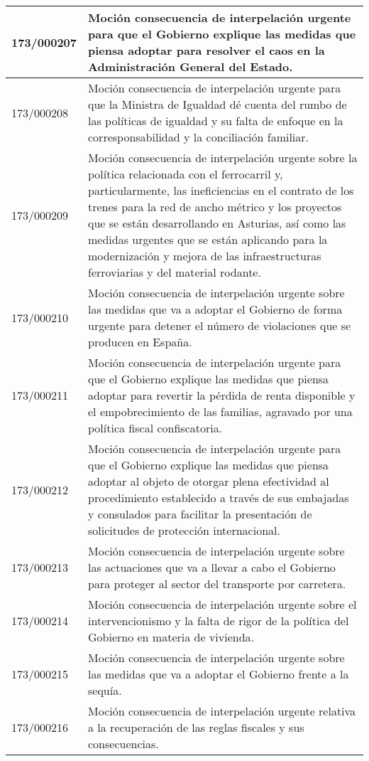 {\begin{table}[H]
\begin{center}
\begin{tabularx}{\linewidth}{| l | X |}
\hline
173/000207 & Moción consecuencia de interpelación urgente para que el Gobierno explique las medidas que piensa adoptar para resolver el caos en la Administración General del Estado. \\
\hline
173/000208 & Moción consecuencia de interpelación urgente para que la Ministra de Igualdad dé cuenta del rumbo de las políticas de igualdad y su falta de enfoque en la corresponsabilidad y la conciliación familiar. \\
\hline
173/000209 & Moción consecuencia de interpelación urgente sobre la política relacionada con el ferrocarril y, particularmente, las ineficiencias en el contrato de los trenes para la red de ancho métrico y los proyectos que se están desarrollando en Asturias, así como las medidas urgentes que se están aplicando para la modernización y mejora de las infraestructuras ferroviarias y del material rodante. \\
\hline
173/000210 & Moción consecuencia de interpelación urgente sobre las medidas que va a adoptar el Gobierno de forma urgente para detener el número de violaciones que se producen en España. \\
\hline
173/000211 & Moción consecuencia de interpelación urgente para que el Gobierno explique las medidas que piensa adoptar para revertir la pérdida de renta disponible y el empobrecimiento de las familias, agravado por una política fiscal confiscatoria. \\
\hline
173/000212 & Moción consecuencia de interpelación urgente para que el Gobierno explique las medidas que piensa adoptar al objeto de otorgar plena efectividad al procedimiento establecido a través de sus embajadas y consulados para facilitar la presentación de solicitudes de protección internacional. \\
\hline
173/000213 & Moción consecuencia de interpelación urgente sobre las actuaciones que va a llevar a cabo el Gobierno para proteger al sector del transporte por carretera. \\
\hline
173/000214 & Moción consecuencia de interpelación urgente sobre el intervencionismo y la falta de rigor de la política del Gobierno en materia de vivienda. \\
\hline
173/000215 & Moción consecuencia de interpelación urgente sobre las medidas que va a adoptar el Gobierno frente a la sequía. \\
\hline
173/000216 & Moción consecuencia de interpelación urgente relativa a la recuperación de las reglas fiscales y sus consecuencias. \\

\end{tabularx}
\end{center}
\end{table}}
